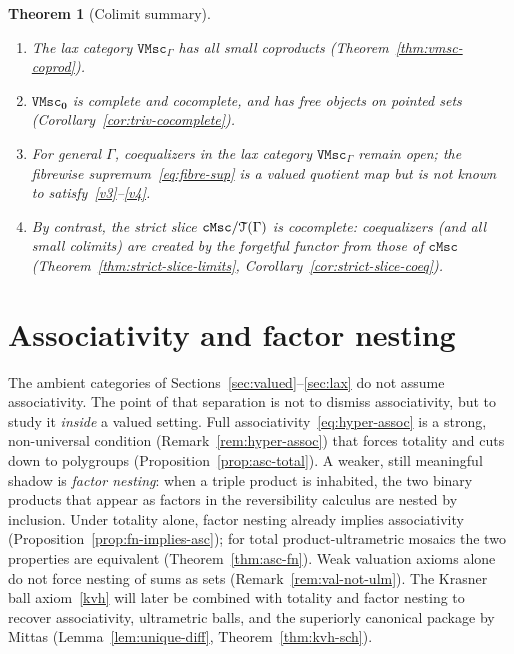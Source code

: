 \documentclass[11pt]{amsart}
\theoremstyle{plain}
\newtheorem{theorem}{Theorem}[section]
\theoremstyle{definition}
\theoremstyle{remark}
\newcommand{\T}{\EuScript{T}}
\newcommand{\cMsc}{\mathtt{cMsc}}
\newcommand{\VMsc}{\mathtt{VMsc}}
\newcommand{\VMscG}{\mathtt{VMsc}_{\Gamma}}
\begin{document}
\begin{theorem}[Colimit summary]
\label{thm:vmsc-cocomplete}
\begin{enumerate}[label=(\alph*)]
\item The lax category \(\VMscG\) has all small coproducts (Theorem~\ref{thm:vmsc-coprod}).
\item \(\VMsc_{\mathbf{0}}\) is complete and cocomplete, and has free objects on pointed sets (Corollary~\ref{cor:triv-cocomplete}).
\item For general \(\Gamma\), coequalizers in the \emph{lax} category \(\VMscG\) remain open; the fibrewise supremum~\eqref{eq:fibre-sup} is a valued quotient map but is not known to satisfy~\eqref{v3}--\eqref{v4}.
\item By contrast, the \emph{strict} slice \(\cMsc/\T(\Gamma)\) is cocomplete: coequalizers (and all small colimits) are created by the forgetful functor from those of \(\cMsc\) (Theorem~\ref{thm:strict-slice-limits}, Corollary~\ref{cor:strict-slice-coeq}).
\end{enumerate}
\end{theorem}


\section{Associativity and factor nesting}
\label{sec:assoc}

The ambient categories of Sections~\ref{sec:valued}--\ref{sec:lax} do not assume associativity. The point of that separation is not to dismiss associativity, but to study it \emph{inside} a valued setting. Full associativity~\eqref{eq:hyper-assoc} is a strong, non-universal condition (Remark~\ref{rem:hyper-assoc}) that forces totality and cuts down to polygroups (Proposition~\ref{prop:asc-total}). A weaker, still meaningful shadow is \emph{factor nesting}: when a triple product is inhabited, the two binary products that appear as factors in the reversibility calculus are nested by inclusion. Under totality alone, factor nesting already implies associativity (Proposition~\ref{prop:fn-implies-asc}); for total product-ultrametric mosaics the two properties are equivalent (Theorem~\ref{thm:asc-fn}). Weak valuation axioms alone do not force nesting of sums as sets (Remark~\ref{rem:val-not-ulm}). The Krasner ball axiom~\eqref{kvh} will later be combined with totality and factor nesting to recover associativity, ultrametric balls, and the superiorly canonical package by Mittas (Lemma~\ref{lem:unique-diff}, Theorem~\ref{thm:kvh-sch}). 
\end{document}
